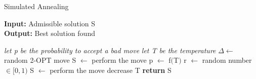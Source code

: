 \begin{algorithm}
	\caption{Simulated Annealing}\label{Annealing method}
	\hspace*{\algorithmicindent} \textbf{Input:} Admissible solution S \\
	\hspace*{\algorithmicindent} \textbf{Output:} Best solution found
    \begin{algorithmic}[1]
    		\State \textit{let p be the probability to accept a bad move}
    		\State \textit{let T be the temperature}
			\State $\Delta \leftarrow$ random 2-OPT move
				\State S $\leftarrow$ perform the move
			\Else 
				\State p $\leftarrow$ f$($T$)$
				\State r $\leftarrow$ random number $\in [0, 1)$
					\State S $\leftarrow$ perform the move
				\EndIf 
			\EndIf
				\State decrease T
			\EndIf
		\EndWhile
		\State \textbf{return} S
    \end{algorithmic}
\end{algorithm}

